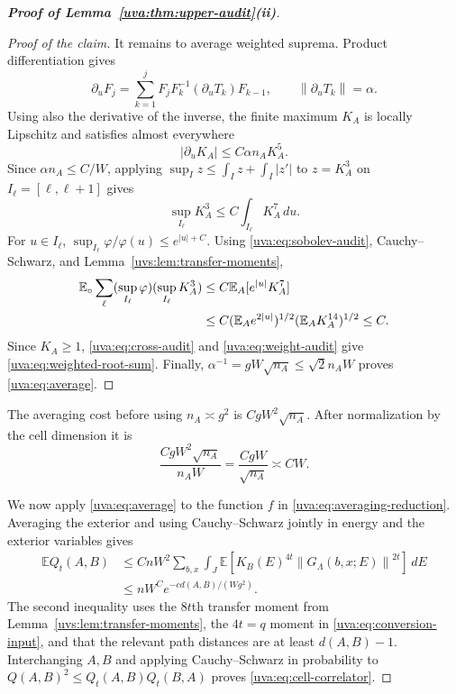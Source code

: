 \documentclass[11pt]{article}
\numberwithin{equation}{section}
\theoremstyle{remark}
\newcommand{\E}{\mathbb E}
\newcommand{\norm}[1]{\left\|#1\right\|}
\begin{document}
\begin{proof}[\textbf{Proof of Lemma~\ref{uva:thm:upper-audit}\textup{(ii)}}]
\begin{proof}[Proof of the claim]
It remains to average weighted suprema. Product differentiation gives
\[
 \partial_uF_j=\sum_{k=1}^jF_jF_k^{-1}(\partial_uT_k)F_{k-1},\qquad
 \norm{\partial_uT_k}=\alpha.
\]
Using also the derivative of the inverse, the finite maximum $K_A$
is locally Lipschitz and satisfies almost everywhere
\[
 |\partial_uK_A|\le C\alpha n_AK_A^5.
\]
Since $\alpha n_A\le C/W$, applying
$\sup_I z\le\int_Iz+\int_I|z'|$ to $z=K_A^3$ on
$I_\ell=[\ell,\ell+1]$ gives
\begin{equation}\label{uva:eq:sobolev-audit}
 \sup_{I_\ell}K_A^3\le C\int_{I_\ell}K_A^7\,du.
\end{equation}
For $u\in I_\ell$, $\sup_{I_\ell}\varphi/\varphi(u)
\le e^{|u|+C}$.
Using \eqref{uva:eq:sobolev-audit}, Cauchy--Schwarz, and
Lemma~\ref{uvs:lem:transfer-moments},
\begin{align}
 \E_\circ\sum_\ell(\sup_{I_\ell}\varphi)
                         (\sup_{I_\ell}K_A^3)
 &\le C\E_A[e^{|u|}K_A^7]\notag\\
 &\le C(\E_A e^{2|u|})^{1/2}
              (\E_A K_A^{14})^{1/2}\le C.\label{uva:eq:weight-audit}
\end{align}
Since $K_A\ge1$, \eqref{uva:eq:cross-audit} and
\eqref{uva:eq:weight-audit} give \eqref{uva:eq:weighted-root-sum}.
Finally, $\alpha^{-1}=gW\sqrt{n_A}\le\sqrt2 n_AW$ proves
\eqref{uva:eq:average}.
\end{proof}

The averaging cost before using $n_A\asymp g^2$ is $CgW^2\sqrt{n_A}$.
After normalization by the cell dimension it is
\[
 \frac{CgW^2\sqrt{n_A}}{n_AW}
       =\frac{CgW}{\sqrt{n_A}}\asymp CW.
\]

We now apply \eqref{uva:eq:average} to the function $f$ in
\eqref{uva:eq:averaging-reduction}. Averaging the exterior and using
Cauchy--Schwarz jointly in energy and the exterior variables gives
\[
 \begin{aligned}
 \E Q_t(A,B)&\le CnW^2\sum_{b,x}\int_J
           \E[K_B(E)^{4t}\norm{G_\Lambda(b,x;E)}^{2t}]\,dE\\
 &\le nW^C e^{-cd(A,B)/(Wg^2)}.
 \end{aligned}
\]
The second inequality uses the $8t$th transfer moment from
Lemma~\ref{uvs:lem:transfer-moments}, the $4t=q$ moment in
\eqref{uva:eq:conversion-input}, and that the relevant path distances
are at least $d(A,B)-1$.
Interchanging $A,B$ and applying Cauchy--Schwarz in probability to
$Q(A,B)^2\le Q_t(A,B)Q_t(B,A)$ proves \eqref{uva:eq:cell-correlator}.


\end{proof}
\end{document}
